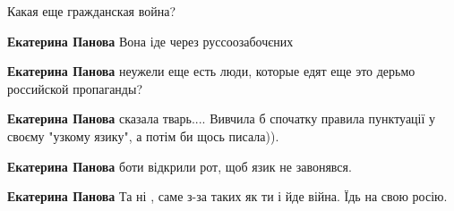 \begin{itemize}
\begin{itemize}
 
Какая еще гражданская война?

 
\textbf{Екатерина Панова} Вона іде через руссоозабочєних

 
\textbf{Екатерина Панова} неужели еще есть люди, которые едят еще это дерьмо российской пропаганды?

 
\textbf{Екатерина Панова} сказала тварь....
Вивчила б спочатку правила пунктуації у своєму "узкому язику", а потім би щось писала)).

 
\textbf{Екатерина Панова} боти відкрили рот, щоб язик не завонявся.

 
\textbf{Екатерина Панова} Та ні , саме з-за таких як ти і йде війна. Їдь на свою росію.

 

\end{itemize}
\end{itemize}
